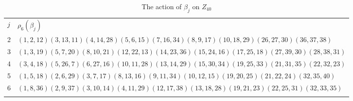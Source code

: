 \documentclass[12pt,a4paper]{article}
\numberwithin{equation}{section}
\numberwithin{table}{section}
\begin{document}
\begin{table}[!htbp]
\centering
\footnotesize
\captionsetup{font=footnotesize}
\caption{The action of $\beta_j$ on $Z_{40}$}
\label{tab:PermutationRepresentationOnZ40Betaj}
\begin{tabular}{ll}
\hline\noalign{\smallskip}
$j$        & $\rho_6(\beta_j)$ \\
\noalign{\smallskip}\hline\noalign{\smallskip}
2  & $(1,2,12)(3,13,11)(4,14,28)(5,6,15)(7,16,34)(8,9,17)(10,18,29)(26,27,30)(36,37,38)$ \\
3  & $(1,3,19)(5,7,20)(8,10,21)(12,22,13)(14,23,36)(15,24,16)(17,25,18)(27,39,30)(28,38,31)$ \\
4  & $(3,4,18)(5,26,7)(6,27,16)(10,11,28)(13,14,29)(15,30,34)(19,25,33)(21,31,35)(22,32,23)$ \\
5  & $(1,5,18)(2,6,29)(3,7,17)(8,13,16)(9,11,34)(10,12,15)(19,20,25)(21,22,24)(32,35,40)$ \\
6  & $(1,8,36)(2,9,37)(3,10,14)(4,11,29)(12,17,38)(13,18,28)(19,21,23)(22,25,31)(32,33,35)$ \\
\noalign{\smallskip}\hline
\end{tabular}
\end{table}
%
\end{document}

